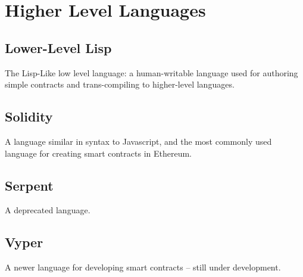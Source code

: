 \documentclass[10pt,a4paper,leqno,bibliography=totoc]{scrartcl}
\newenvironment{alphafootnotes}
{\par\edef\savedfootnotenumber{\number\value{footnote}}
\renewcommand{\thefootnote}{\alph{footnote}}
\setcounter{footnote}{0}}
{\par\setcounter{footnote}{\savedfootnotenumber}}
\begin{document}
\begin{alphafootnotes}
		
	\section{Higher Level Languages}
		\subsection{Lower-Level Lisp}
			The Lisp-Like low level language: a human-writable language used for authoring simple contracts and trans-compiling to higher-level languages.
	
		\subsection{Solidity}
			A language similar in syntax to Javascript, and the most commonly used language for creating smart contracts in Ethereum.
		\subsection{Serpent}
			A deprecated language.
		\subsection{Vyper}
			A newer language for developing smart contracts -- still under development.



\clearpage
\begin{multicols*}{2}
\printbibliography
\clearpage
\printglossary[type=\acronymtype]
\glsaddall
\printnoidxglossaries
\clearpage
\end{multicols*}
\end{alphafootnotes}

\printindex
\end{document}

